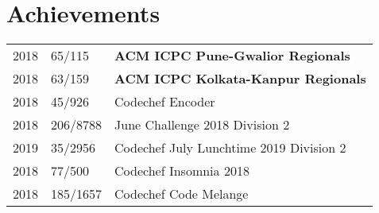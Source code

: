 \documentclass[]{deedy-resume-openfont}
\begin{document}
\begin{minipage}[t]{0.66\textwidth}

\section{Achievements} 
\begin{tabular}{rll}
\textmd{2018}	     & \textmd{65/115}  & \textbf{ACM ICPC Pune-Gwalior Regionals}\\
\textmd{2018}	     & \textmd{63/159}  & \textbf{ACM ICPC Kolkata-Kanpur Regionals}\\
\textmd{2018}	     & \textmd{45/926}  & \textmd{Codechef Encoder}\\
\textmd{2018}         & \textmd{206/8788}  &\textmd{June Challenge 2018 Division 2}\\ 
\textmd{2019}         & \textmd{35/2956}  &\textmd{Codechef July Lunchtime 2019 Division 2}\\
\textmd{2018}         & \textmd{77/500}  & \textmd{Codechef  Insomnia 2018}\\
\textmd{2018}         & \textmd{185/1657}  & \textmd{Codechef  Code Melange}\\
\end{tabular}
\sectionsep

\end{minipage} 
\end{document}
